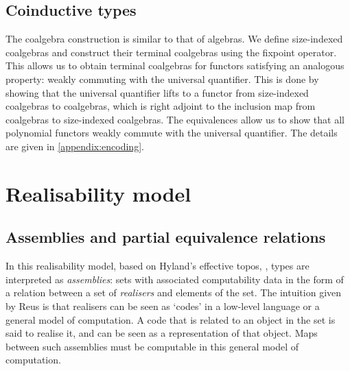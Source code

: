\subsection{Coinductive types}
The coalgebra construction is similar to that of algebras. We define size-indexed coalgebras and construct their terminal coalgebras using the fixpoint operator. This allows us to obtain terminal coalgebras for functors satisfying an analogous property: weakly commuting with the universal quantifier. This is done by showing that the universal quantifier lifts to a functor from size-indexed coalgebras to coalgebras, which is right adjoint to the inclusion map from coalgebras to size-indexed coalgebras. 
The equivalences allow us to show that all polynomial functors weakly commute with the universal quantifier.
The details are given in \autoref{appendix:encoding}.

    
    \section{Realisability model}
    \label{sec:model}
    

\subsection{Assemblies and partial equivalence relations}


In this realisability model, based on Hyland's effective topos, \cite{hyland_effective_1982}, types are interpreted as \emph{assemblies}: sets with associated computability data in the form of a relation between a set of \emph{realisers} and elements of the set.
The intuition given by Reus \cite{REUS1999128} is that realisers can be seen as `codes' in a low-level language or a general model of computation. A code that is related to an object in the set is said to realise it, and can be seen as a representation of that object. Maps between such assemblies must be computable in this general model of computation. 

